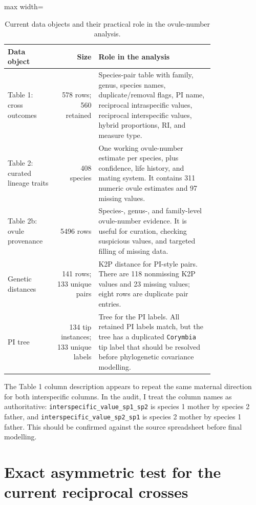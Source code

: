 \documentclass[12pt]{article}
\begin{document}
\begin{table}[H]
\centering
\small
\begin{adjustbox}{max width=\linewidth}
\begin{tabular}{>{\raggedright\arraybackslash}p{0.24\linewidth} r >{\raggedright\arraybackslash}p{0.56\linewidth}}
\toprule
Data object & Size & Role in the analysis \\
\midrule
Table 1: cross outcomes & 578 rows; 560 retained & Species-pair table with family, genus, species names, duplicate/removal flags, PI name, reciprocal intraspecific values, reciprocal interspecific values, hybrid proportions, RI, and measure type. \\
Table 2: curated lineage traits & 408 species & One working ovule-number estimate per species, plus confidence, life history, and mating system. It contains 311 numeric ovule estimates and 97 missing values. \\
Table 2b: ovule provenance & 5496 rows & Species-, genus-, and family-level ovule-number evidence. It is useful for curation, checking suspicious values, and targeted filling of missing data. \\
Genetic distances & 141 rows; 133 unique pairs & K2P distance for PI-style pairs. There are 118 nonmissing K2P values and 23 missing values; eight rows are duplicate pair entries. \\
PI tree & 134 tip instances; 133 unique labels & Tree for the PI labels. All retained PI labels match, but the tree has a duplicated \texttt{Corymbia} tip label that should be resolved before phylogenetic covariance modelling. \\
\bottomrule
\end{tabular}
\end{adjustbox}
\caption{Current data objects and their practical role in the ovule-number analysis.}
\label{tab:data-objects}
\end{table}

\begin{cautionbox}
The Table 1 column description appears to repeat the same maternal direction for both interspecific columns. In the audit, I treat the column names as authoritative: \texttt{interspecific\_value\_sp1\_sp2} is species 1 mother by species 2 father, and \texttt{interspecific\_value\_sp2\_sp1} is species 2 mother by species 1 father. This should be confirmed against the source spreadsheet before final modelling.
\end{cautionbox}

\section{Exact asymmetric test for the current reciprocal crosses}
\end{document}
